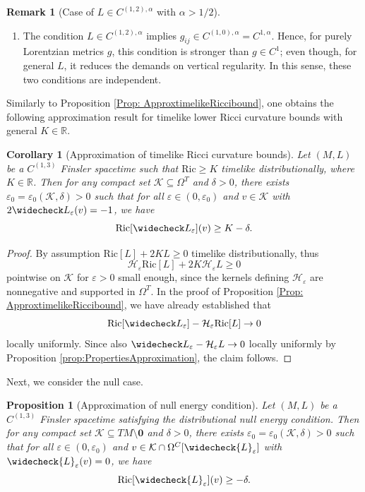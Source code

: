 \documentclass[a4paper,11pt]{article}
\numberwithin{equation}{section}
\theoremstyle{definition}
\newtheorem{Remark}[Definition]{Remark}
\theoremstyle{plain}
\newtheorem{Proposition}[Definition]{Proposition}
\newtheorem{Corollary}[Definition]{Corollary}
\newcommand{\R}{\mathbb R}
\newcommand{\eps}{\varepsilon}
\newcommand{\Ric}{\mathrm{Ric}}
\begin{document}
\begin{Remark}[Case of $L \in C^{(1,2),\alpha}$ with $\alpha>1/2$]
\begin{enumerate}
    \item[(b)]
    The condition $L \in C^{(1,2),\alpha}$ implies $g_{ij} \in C^{(1,0),\alpha}=C^{1,\alpha}$.
    Hence, for purely Lorentzian metrics $g$, this condition is stronger than $g \in C^{1}$; even though, for general $L$, it reduces the demands on vertical regularity.
    In this sense, these two conditions are independent.
\end{enumerate}
\end{Remark}

Similarly to Proposition \ref{Prop: ApproxtimelikeRiccibound}, one obtains the following approximation result for timelike lower Ricci curvature bounds with general $K \in \R$. 

\begin{Corollary}[Approximation of timelike Ricci curvature bounds]
\label{cor:GeneralRicciBound}
    Let $(M,L)$ be a $C^{(1,3)}$ Finsler spacetime such that $\mathrm{Ric} \geq K$ timelike distributionally, where $K \in \R$. 
    Then for any compact set $\mathcal{K} \subseteq \Omega^T$ and $\delta > 0$, there exists $\varepsilon_0 = \varepsilon_0(\mathcal{K},\delta) > 0$ such that for all $\varepsilon \in (0,\varepsilon_0)$ and $v \in \mathcal{K}$ with $2 \widecheck L_\varepsilon(v) = -1$, we have
    \begin{equation*}
        \Ric[\widecheck L_\varepsilon](v) \geq K - \delta.
    \end{equation*}
\end{Corollary}

\begin{proof}
By assumption $\Ric[L]+2KL\geq0$ timelike distributionally, thus
\[
    \mathcal H_\varepsilon\Ric[L]
    +2K \mathcal H_\varepsilon L \geq 0
\]
pointwise on $\mathcal K$ for $\eps >0$
small enough, since the kernels defining $\mathcal H_\varepsilon$ are
nonnegative and supported in $\Omega^T$.
In the proof of
Proposition \ref{Prop: ApproxtimelikeRiccibound}, we have already established that
\[
    \operatorname{Ric}[\widecheck L_\varepsilon]
    -\mathcal H_\varepsilon\Ric[L]\rightarrow0
\]
locally uniformly.
Since also
$\widecheck L_\varepsilon-\mathcal H_\varepsilon L\to0$ locally uniformly by Proposition \ref{prop:PropertiesApproximation}, the claim follows.
\end{proof}

Next, we consider the null case.

\begin{Proposition}[Approximation of null energy condition]
\label{Prop: Null approximate Ricci}
    Let $(M,L)$ be a $C^{(1,3)}$ Finsler spacetime satisfying the distributional null energy condition. 
    Then for any compact set $\mathcal K \subseteq TM \setminus \mathbf 0$ and $\delta > 0$, there exists $\varepsilon_0 = \varepsilon_0(\mathcal K,\delta)>0$ such that for all $\varepsilon \in (0,\varepsilon_0)$ and $v \in \mathcal{K} \cap \Omega^C[\widecheck{L}_\eps]$ with $\widecheck{L}_\varepsilon(v) = 0$, we have
    \begin{equation*}
        \Ric[\widecheck{L}_\eps](v) \ge - \delta.
    \end{equation*}
\end{Proposition}
\end{document}
